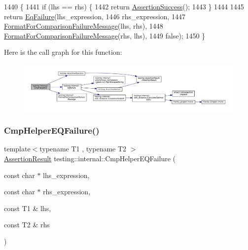\begin{DoxyCode}
1440                                             \{
1441   \textcolor{keywordflow}{if} (lhs == rhs) \{
1442     \textcolor{keywordflow}{return} \hyperlink{namespacetesting_ac1d0baedb17286c5c6c87bd1a45da8ac}{AssertionSuccess}();
1443   \}
1444 
1445   \textcolor{keywordflow}{return} \hyperlink{namespacetesting_1_1internal_a08725846ff184d3e79bcf5be4df19157}{EqFailure}(lhs\_expression,
1446                    rhs\_expression,
1447                    \hyperlink{namespacetesting_1_1internal_a91ab078f10adc669f09b7f604975c518}{FormatForComparisonFailureMessage}(lhs, rhs),
1448                    \hyperlink{namespacetesting_1_1internal_a91ab078f10adc669f09b7f604975c518}{FormatForComparisonFailureMessage}(rhs, lhs),
1449                    \textcolor{keyword}{false});
1450 \}
\end{DoxyCode}
Here is the call graph for this function\+:
\nopagebreak
\begin{figure}[H]
\begin{center}
\leavevmode
\includegraphics[width=350pt]{namespacetesting_1_1internal_a46582d95cbfe3d3d8f6945c9e9cd779c_cgraph}
\end{center}
\end{figure}
\mbox{\label{namespacetesting_1_1internal_a1def8ec9393360a1b34a20528703e7f7}} 
\subsubsection{\texorpdfstring{Cmp\+Helper\+E\+Q\+Failure()}{CmpHelperEQFailure()}}
{\footnotesize\ttfamily template$<$typename T1 , typename T2 $>$ \\
\hyperlink{classtesting_1_1AssertionResult}{Assertion\+Result} testing\+::internal\+::\+Cmp\+Helper\+E\+Q\+Failure (\begin{DoxyParamCaption}\item[{const char $\ast$}]{lhs\+\_\+expression,  }\item[{const char $\ast$}]{rhs\+\_\+expression,  }\item[{const T1 \&}]{lhs,  }\item[{const T2 \&}]{rhs }\end{DoxyParamCaption})}



